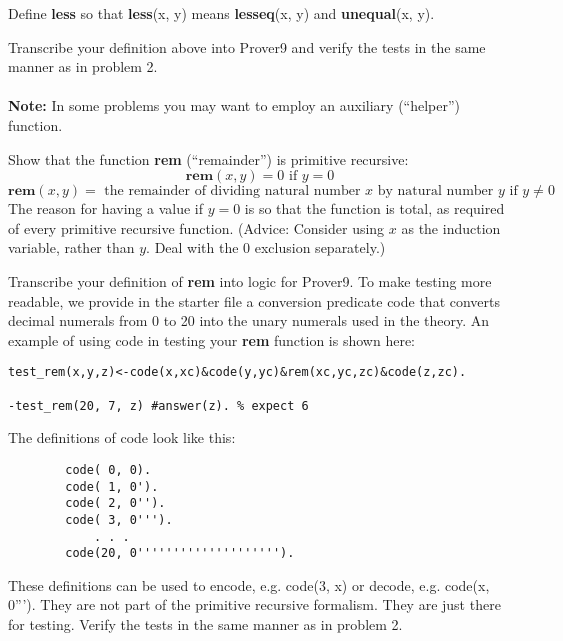 \documentclass[12pt,hidelinks,letterpaper,boxed,cm]{hmcpset}
\newcommand{\tb}[1]{\textbf{#1}}
\renewcommand{\t}[1]{\text{#1}}
\begin{document}
\begin{solution}
    \vfill
\end{solution}
\newpage

\begin{problem}[3.]
    [1 point] Define \tb{less} so that \tb{less}(x, y) means \tb{lesseq}(x, y) and \tb{unequal}(x, y).
\end{problem}

\begin{solution}
    \vfill
\end{solution}
\newpage

\begin{problem}[4.]
    [1 point] Transcribe your definition above into Prover9 and verify the tests in the same manner as in problem 2.\\\\
    \tb{Note:} In some problems you may want to employ an auxiliary (“helper”) function.
\end{problem}

\begin{solution}
    \vfill
\end{solution}
\newpage

\begin{problem}[5.]
    [3 points] Show that the function \tb{rem} (“remainder”) is primitive recursive:
    $$\bm{rem}(x, y) = 0 \t{ if } y = 0$$
    $$\bm{rem}(x, y) =\t{ the remainder of dividing natural number $x$ by natural number $y$ if }y \ne 0$$
    The reason for having a value if $y = 0$ is so that the function is total, as required of every primitive recursive function. (Advice: Consider using $x$ as the induction variable, rather than $y$. Deal with the 0 exclusion separately.)
\end{problem}

\begin{solution}
    \vfill
\end{solution}
\newpage

\begin{problem}[6.]
    [3 points] Transcribe your definition of \tb{rem} into logic for Prover9. To make testing more readable, we provide in the starter file a conversion predicate code that converts decimal numerals from 0 to 20 into the unary numerals used in the theory. An example of using code in testing your \tb{rem} function is shown here:
    \begin{lstlisting}
test_rem(x,y,z)<-code(x,xc)&code(y,yc)&rem(xc,yc,zc)&code(z,zc).

-test_rem(20, 7, z) #answer(z). % expect 6
    \end{lstlisting}
    The definitions of code look like this:
    \begin{lstlisting}
        code( 0, 0).
        code( 1, 0').
        code( 2, 0'').
        code( 3, 0''').
            . . .
        code(20, 0'''''''''''''''''''').
    \end{lstlisting}
    These definitions can be used to encode, e.g. code(3, x) or decode, e.g. code(x, 0'''). They are not part of the primitive recursive formalism. They are just there for testing.
    Verify the tests in the same manner as in problem 2.
\end{problem}
\end{document}
